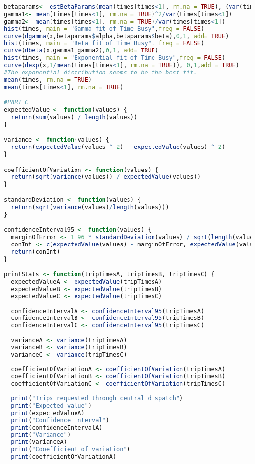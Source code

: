 \documentclass{article}
\begin{document}
\begin{lstlisting}[language=R]
betaparams<- estBetaParams(mean(times[times<1], rm.na = TRUE), (var(times[times<1])))
gamma1<- mean(times[times<1], rm.na = TRUE)^2/var(times[times<1])
gamma2<- mean(times[times<1], rm.na = TRUE)/var(times[times<1])
hist(times, main = "Gamma fit of Time Busy",freq = FALSE)
curve(dgamma(x,betaparams$alpha,betaparams$beta),0,1, add= TRUE)
hist(times, main = "Beta fit of Time Busy", freq = FALSE)
curve(dbeta(x,gamma1,gamma2),0,1, add= TRUE)
hist(times, main = "Exponential fit of Time Busy",freq = FALSE)
curve(dexp(x,1/mean(times[times<1], rm.na = TRUE)), 0,1,add = TRUE)
#The exponential distribution seems to be the best fit.
mean(times, rm.na = TRUE)
mean(times[times<1], rm.na = TRUE)

#PART C
expectedValue <- function(values) {
  return(sum(values) / length(values))
}

variance <- function(values) {
  return(expectedValue(values ^ 2) - expectedValue(values) ^ 2)
}

coefficientOfVariation <- function(values) {
  return(sqrt(variance(values)) / expectedValue(values))
}

standardDeviation <- function(values) {
  return(sqrt(variance(values)/length(values)))
}

confidenceInterval95 <- function(values) {
  marginOfError <- 1.96 * standardDeviation(values) / sqrt(length(values))
  conInt <- c(expectedValue(values) - marginOfError, expectedValue(values) + marginOfError)
  return(conInt)
}

printStats <- function(tripTimesA, tripTimesB, tripTimesC) {
  expectedValueA <- expectedValue(tripTimesA)
  expectedValueB <- expectedValue(tripTimesB)
  expectedValueC <- expectedValue(tripTimesC)
  
  confidenceIntervalA <- confidenceInterval95(tripTimesA)
  confidenceIntervalB <- confidenceInterval95(tripTimesB)
  confidenceIntervalC <- confidenceInterval95(tripTimesC)
  
  varianceA <- variance(tripTimesA)
  varianceB <- variance(tripTimesB)
  varianceC <- variance(tripTimesC)
  
  coefficientOfVariationA <- coefficientOfVariation(tripTimesA)
  coefficientOfVariationB <- coefficientOfVariation(tripTimesB)
  coefficientOfVariationC <- coefficientOfVariation(tripTimesC)
  
  print("Trips requested through central dispatch")
  print("Expected value")
  print(expectedValueA)
  print("Confidence interval")
  print(confidenceIntervalA)
  print("Variance")
  print(varianceA)
  print("Cooefficient of variation")
  print(coefficientOfVariationA)
  

\end{lstlisting}
\end{document}
